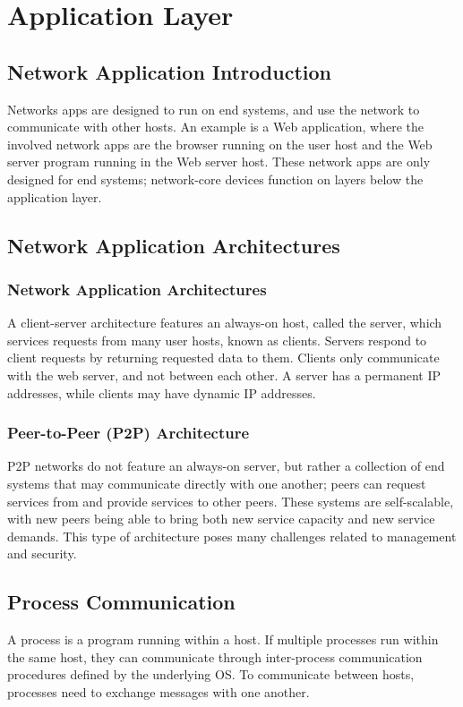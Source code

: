 \documentclass[12pt,titlepage]{article}
\begin{document}
  \section{Application Layer}
    \subsection{Network Application Introduction}
      Networks apps are designed to run on end systems, and use the network to communicate with other hosts. An example is a Web application, where the involved network
      apps are the browser running on the user host and the Web server program running in the Web server host. These network apps are only designed for end systems;
      network-core devices function on layers below the application layer.

    \subsection{Network Application Architectures}
      \subsubsection{Network Application Architectures}
        A client-server architecture features an always-on host, called the server, which services requests from many user hosts, known as clients. Servers respond to
        client requests by returning requested data to them. Clients only communicate with the web server, and not between each other. A server has a permanent IP addresses,
        while clients may have dynamic IP addresses.

      \subsubsection{Peer-to-Peer (P2P) Architecture}
        P2P networks do not feature an always-on server, but rather a collection of end systems that may communicate directly with one another; peers can request services
        from and provide services to other peers. These systems are self-scalable, with new peers being able to bring both new service capacity and new service demands. This
        type of architecture poses many challenges related to management and security.

    \subsection{Process Communication}
      A process is a program running within a host. If multiple processes run within the same host, they can communicate through inter-process communication procedures defined
      by the underlying OS. To communicate between hosts, processes need to exchange messages with one another.
\end{document}
